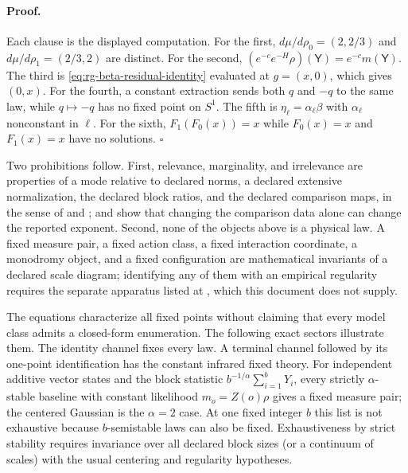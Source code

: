\paragraph{Proof.}
Each clause is the displayed computation.  For the first,
$d\mu/d\rho_0=(2,2/3)$ and $d\mu/d\rho_1=(2/3,2)$ are distinct.  For the second,
$(e^{-c}e^{-H}\rho)(\mathsf Y)=e^{-c}m(\mathsf Y)$.  The third is
\eqref{eq:rg-beta-residual-identity} evaluated at $g=(x,0)$, which gives
$(0,x)$.  For the fourth, a constant extraction sends both $q$ and $-q$ to the
same law, while $q\mapsto-q$ has no fixed point on $S^1$.  The fifth is
$\eta_\ell=\alpha_\ell\beta$ with $\alpha_\ell$ nonconstant in $\ell$.  For the
sixth, $F_1(F_0(x))=x$ while $F_0(x)=x$ and $F_1(x)=x$ have no
solutions. $\square$

Two prohibitions follow.  First, relevance, marginality, and irrelevance are
properties of a mode relative to declared norms, a declared extensive
normalization, the declared block ratios, and the declared comparison maps, in
the sense of  and
;  and
 show that changing the comparison data alone
can change the reported exponent.  Second, none of the objects above is a
physical law.  A fixed measure pair, a fixed action class, a fixed interaction
coordinate, a monodromy object, and a fixed configuration are mathematical
invariants of a declared scale diagram; identifying any of them with an
empirical regularity requires the separate apparatus listed at
, which this document does not supply.

The equations characterize all fixed points without claiming that every model
class admits a closed-form enumeration.  The following exact sectors illustrate
them.  The identity channel fixes every law.  A terminal channel followed by
its one-point identification has the constant infrared fixed theory.  For
independent additive vector states and the block statistic
$b^{-1/\alpha}\sum_{i=1}^bY_i$, every strictly $\alpha$-stable baseline
with constant likelihood $m_o=Z(o)\rho$ gives a fixed measure pair; the
centered Gaussian is the $\alpha=2$ case.  At one fixed integer $b$ this
list is not exhaustive because $b$-semistable laws can also be fixed.
Exhaustiveness by strict stability requires invariance over all declared block
sizes (or a continuum of scales) with the usual centering and regularity
hypotheses.  

